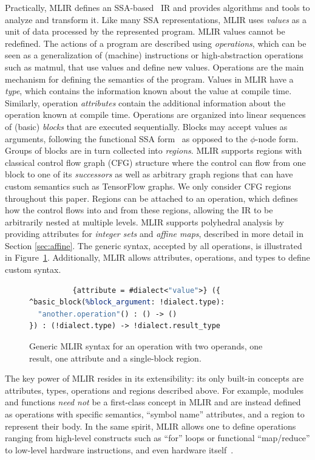 \documentclass[sigplan]{acmart}
\begin{document}
Practically, MLIR defines an SSA-based~\cite{ssa} IR and provides algorithms and tools to analyze and transform it.
Like many SSA representations, MLIR uses \emph{values} as a unit of data processed by the represented program.
MLIR values cannot be redefined.
The actions of a program are described using \emph{operations}, which can be seen as a generalization of (machine) instructions or high-abstraction operations such as matmul, that use values and define new values.
Operations are the main mechanism for defining the semantics of the program.
Values in MLIR have a \emph{type}, which contains the information known about the value at compile time.
Similarly, operation \emph{attributes} contain the additional information about the operation known at compile time.
Operations are organized into linear sequences of (basic) \emph{blocks} that are executed sequentially.
Blocks may accept values as arguments, following the functional SSA form~\cite{appel1998ssa} as opposed to the $\phi$-node form.
Groups of blocks are in turn collected into \emph{regions}.
MLIR supports regions with classical control flow graph (CFG) structure where the control can flow from one block to one of its \emph{successors} as well as arbitrary graph regions that can have custom semantics such as TensorFlow graphs.
We only consider CFG regions throughout this paper.
Regions can be attached to an operation, which defines how the control flows into and from these regions, allowing the IR to be arbitrarily nested at multiple levels.
MLIR supports polyhedral analysis by providing attributes for \emph{integer sets} and \emph{affine maps}, described in more detail in Section \ref{sec:affine}.
The generic syntax, accepted by all operations, is illustrated in Figure~\ref{fig:mlir_syntax}.
Additionally, MLIR allows attributes, operations, and types to define custom syntax.

\begin{figure}
{
\scriptsize
\begin{lstlisting}[language=llvm,escapeinside=@@, mathescape=true]
%result = "dialect.operation"(%operand, %operand)
          {attribute = #dialect<"value">} ({
^basic_block(%block_argument: !dialect.type):
  "another.operation"() : () -> ()
}) : (!dialect.type) -> !dialect.result_type
\end{lstlisting}
}
\caption{Generic MLIR syntax for an operation with two operands, one result, one attribute and a single-block region.}
\label{fig:mlir_syntax}
\end{figure}

The key power of MLIR resides in its extensibility: its only built-in concepts are attributes, types, operations and regions described above.
For example, modules and functions \emph{need not} be a first-class concept in MLIR and are instead defined as operations with specific semantics, ``symbol name'' attributes, and a region to represent their body.
In the same spirit, MLIR allows one to define operations ranging from high-level constructs such as ``for'' loops or functional ``map/reduce'' to low-level hardware instructions, and even hardware itself~\cite{circt}.
\end{document}
